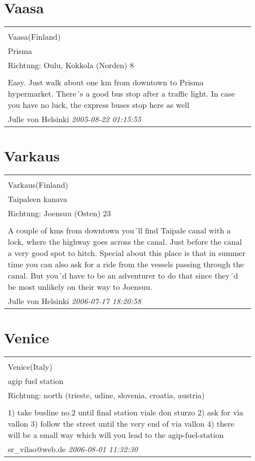 \documentclass[a4paper,12pt]{article}
\begin{document}
\section{Vaasa}
\begin{tabular}{|p{13cm}|}
\hline\\
Vaasa(Finland)\\
Prisma\\
Richtung: Oulu, Kokkola (Norden) 8 \\
\hline\\
Easy. Just walk about one km from downtown to Prisma hypermarket. There´s a good bus stop after a traffic light. In case you have no luck, the express buses stop here as well \\
Julle von Helsinki \textit{ 2005-08-22 01:15:55 }\\\hline
\end{tabular}


\section{Varkaus}
\begin{tabular}{|p{13cm}|}
\hline\\
Varkaus(Finland)\\
Taipaleen kanava\\
Richtung: Joensuu (Osten) 23 \\
\hline\\
A couple of kms from downtown you´ll find Taipale canal with a lock, where the highway goes across the canal. Just before the canal a very good spot to hitch. Special about this place is that in summer time you can also ask for a ride from the vessels passing through the canal. But you´d have to be an adventurer to do that since they´d be most unlikely on their way to Joensuu. \\
Julle von Helsinki \textit{ 2006-07-17 18:20:58 }\\\hline
\end{tabular}


\section{Venice}
\begin{tabular}{|p{13cm}|}
\hline\\
Venice(Italy)\\
agip fuel station\\
Richtung: north (trieste, udine, slovenia, croatia, austria) \\
\hline\\
1) take busline no.2 until final station viale don sturzo
2) ask for via vallon
3) follow the street until the very end of via vallon
4) there will be a small way which will you lead to the agip-fuel-station \\
sr\_vilao@web.de \textit{ 2006-08-01 11:32:30 }\\\hline
\end{tabular}
\end{document}
